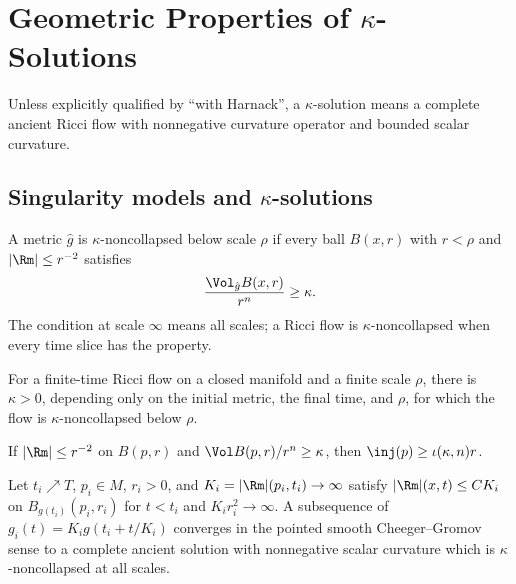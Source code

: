 \chapter[19]{\texorpdfstring{Geometric Properties of $\kappa$-Solutions}{Geometric Properties of Kappa-Solutions}}
\label{ch:chow-iii-kappa-solutions}

Unless explicitly qualified by ``with Harnack'', a \(\kappa\)-solution means
a complete ancient Ricci flow with nonnegative curvature operator and bounded
scalar curvature.

\section{\texorpdfstring{Singularity models and $\kappa$-solutions}{Singularity models and Kappa-solutions}}

\begin{definition}
\label{def:chow-iii-kappa-noncollapsed}
A metric $\hat g$ is $\kappa$-noncollapsed below scale $\rho$ if every ball
$B(x,r)$ with $r<\rho$ and $|\Rm|\le r^{-2}$ satisfies
\[
\frac{\Vol_{\hat g}B(x,r)}{r^n}\ge\kappa.
\]
The condition at scale $\infty$ means all scales; a Ricci flow is
$\kappa$-noncollapsed when every time slice has the property.
\end{definition}

\begin{theorem}
\label{thm:chow-iii-no-local-collapsing}
For a finite-time Ricci flow on a closed manifold and a finite scale $\rho$,
there is $\kappa>0$, depending only on the initial metric, the final time,
and $\rho$, for which the flow is $\kappa$-noncollapsed below $\rho$.
\end{theorem}

\begin{proposition}
\label{prop:chow-iii-cgt-injectivity}
If $|\Rm|\le r^{-2}$ on $B(p,r)$ and
$\Vol B(p,r)/r^n\ge\kappa$, then $\inj(p)\ge\iota(\kappa,n)r$.
\end{proposition}

\begin{theorem}
\label{thm:chow-iii-finite-time-model}
Let $t_i\nearrow T$, $p_i\in M$, $r_i>0$, and
$K_i=|\Rm|(p_i,t_i)\to\infty$ satisfy
$|\Rm|(x,t)\le CK_i$ on $B_{g(t_i)}(p_i,r_i)$ for $t<t_i$ and
$K_i r_i^2\to\infty$.  A subsequence of
$g_i(t)=K_i g(t_i+t/K_i)$ converges in the pointed smooth
Cheeger--Gromov sense to a complete ancient solution with nonnegative scalar
curvature which is $\kappa$-noncollapsed at all scales.
\end{theorem}

